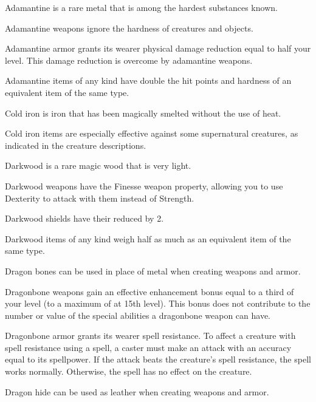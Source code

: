             Adamantine is a rare metal that is among the hardest substances known.

            Adamantine weapons ignore the hardness of creatures and objects.

            Adamantine armor grants its wearer physical damage reduction equal to half your level.
            This damage reduction is overcome by adamantine weapons.

            Adamantine items of any kind have double the hit points and hardness of an equivalent item of the same type.


            Cold iron is iron that has been magically smelted without the use of heat.

            Cold iron items are especially effective against some supernatural creatures, as indicated in the creature descriptions.

            Darkwood is a rare magic wood that is very light.

            Darkwood weapons have the Finesse weapon property, allowing you to use Dexterity to attack with them instead of Strength.

            Darkwood shields have their  reduced by 2.

            Darkwood items of any kind weigh half as much as an equivalent item of the same type.


            Dragon bones can be used in place of metal when creating weapons and armor.

            Dragonbone weapons gain an effective enhancement bonus equal to a third of your level (to a maximum of  at 15th level).
            This bonus does not contribute to the number or value of the special abilities a dragonbone weapon can have.

            Dragonbone armor grants its wearer spell resistance.
            To affect a creature with spell resistance using a spell, a caster must make an attack with an accuracy equal to its spellpower.
            If the attack beats the creature's spell resistance, the spell works normally.
            Otherwise, the spell has no effect on the creature.


            Dragon hide can be used as leather when creating weapons and armor.

